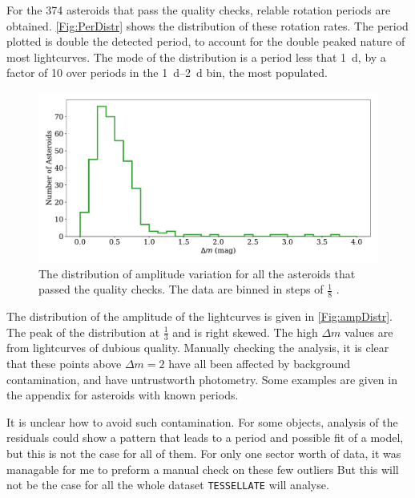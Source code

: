 \documentclass{UCreport}
\begin{document}
For the 374 asteroids that pass the quality checks, relable rotation periods are obtained.
\autoref{Fig:PerDistr} shows the distribution of these rotation rates.
The period plotted is double the detected period, to account for the double peaked nature of most lightcurves.
The mode of the distribution is a period less that \qty{1}{\day}, by a factor of 10 over periods in the \qtyrange{1}{2}{\day} bin, the  most populated.



\begin{figure}[!hb]
  \centering
  \includegraphics[width=\textwidth]{./Figures/delMagDistr.pdf}
  \caption[Amplitude Variation Distribution]{The distribution of amplitude variation for all the asteroids that passed the quality checks.
    The data are binned in steps of $\frac{1}{8}$ \unit{\mag}.
  }
  \label{Fig:ampDistr}
\end{figure}

The distribution of the amplitude of the lightcurves is given in \autoref{Fig:ampDistr}.
The peak of the distribution at $\frac13$ \unit{\mag} and is right skewed.
The high $\Delta m$ values are from lightcurves of dubious quality.
Manually checking the analysis, it is clear that these points above $\Delta m =2$ have all been affected by background contamination, and have untrustworth photometry.
Some examples are given in the appendix for asteroids with known periods.

It is unclear how to avoid such contamination.
For some objects, analysis of the residuals could show a pattern that leads to a period and possible fit of a model, but this is not the case for all of them.
For only one sector worth of data, it was managable for me to preform a manual check on these few outliers
But this will not be the case for all the whole dataset \texttt{TESSELLATE} will analyse.
\end{document}
